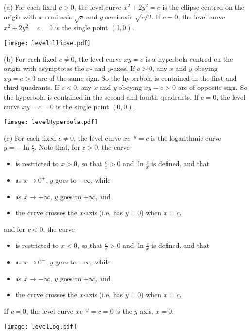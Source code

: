 \begin{solution} (a)
For each fixed $c>0$, the level curve $x^2+2y^2=c$ is the ellipse
centred on the origin with $x$ semi axis $\sqrt{c}$ and 
$y$ semi axis $\sqrt{c/2}$. If $c=0$,  the level curve $x^2+2y^2=c=0$
is the single point $(0,0)$.
\begin{center}
     \texttt{[image: levelEllipse.pdf]}
\end{center}

(b)
For each fixed $c\ne 0$, the level curve $xy=c$ is a hyperbola
centred on the origin with asymptotes the $x$- and $y$-axes. 
If $c>0$, any $x$ and $y$ obeying $xy=c>0$ are of the same sign.
So the hyperbola is contained in the first and third quadrants.
If $c<0$, any $x$ and $y$ obeying $xy=c>0$ are of opposite sign.
So the hyperbola is contained in the second and fourth quadrants.
If $c=0$,  the level curve $xy=c=0$
is the single point $(0,0)$.
\begin{center}
     \texttt{[image: levelHyperbola.pdf]}
\end{center}

(c)
For each fixed $c\ne 0$, the level curve $xe^{-y}=c$ is the logarithmic curve
$y=-\ln\frac{c}{x}$. Note that, for $c>0$, the curve
\begin{itemize}\itemsep1pt \parskip0pt 
\item is restricted to $x>0$, so that $\frac{c}{x}>0$ and $\ln \frac{c}{x}$
  is defined, and that
\item as $x\rightarrow 0^+$, $y$ goes to $-\infty$, while
\item as $x\rightarrow +\infty$, $y$ goes to $+\infty$, and
\item the curve crosses the $x$-axis (i.e. has $y=0$) when $x=c$.
\end{itemize}
and for $c<0$, the curve
\begin{itemize}\itemsep1pt \parskip0pt 
\item is restricted to $x<0$, so that $\frac{c}{x}>0$ and $\ln \frac{c}{x}$
  is defined, and that
\item as $x\rightarrow 0^-$, $y$ goes to $-\infty$, while
\item as $x\rightarrow -\infty$, $y$ goes to $+\infty$, and
\item the curve crosses the $x$-axis (i.e. has $y=0$) when $x=c$.
\end{itemize}
If $c=0$,  the level curve $xe^{-y}=c=0$
is the $y$-axis, $x=0$.
\begin{center}
     \texttt{[image: levelLog.pdf]}
\end{center}



\end{solution}



